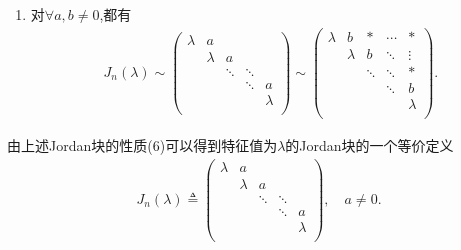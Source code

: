\documentclass[../../main.tex]{subfiles}
\begin{document}
\begin{proposition}[Jordan块的性质]
\begin{enumerate}[(1)]
\item 对$\forall a,b\ne 0$,都有
\begin{align*}
J_n(\lambda )\sim \left( \begin{matrix}
\lambda&		a&		&		&		\\
&		\lambda&		a&		&		\\
&		&		\ddots&		\ddots&		\\
&		&		&		\ddots&		a\\
&		&		&		&		\lambda\\
\end{matrix} \right) \sim \left( \begin{matrix}
\lambda&		b&		*&		\cdots&		*\\
&		\lambda&		b&		\ddots&		\vdots\\
&		&		\ddots&		\ddots&		*\\
&		&		&		\ddots&		b\\
&		&		&		&		\lambda\\
\end{matrix} \right) .
\end{align*}

\end{enumerate}
\end{proposition}
\begin{note}
由上述Jordan块的性质(6)可以得到特征值为$\lambda$的Jordan块的一个等价定义
\begin{align*}
J_n\left( \lambda \right) \triangleq \left( \begin{matrix}
\lambda&		a&		&		&		\\
&		\lambda&		a&		&		\\
&		&		\ddots&		\ddots&		\\
&		&		&		\ddots&		a\\
&		&		&		&		\lambda\\
\end{matrix} \right) ,\quad a\ne 0.
\end{align*}
\end{note}
\end{document}

